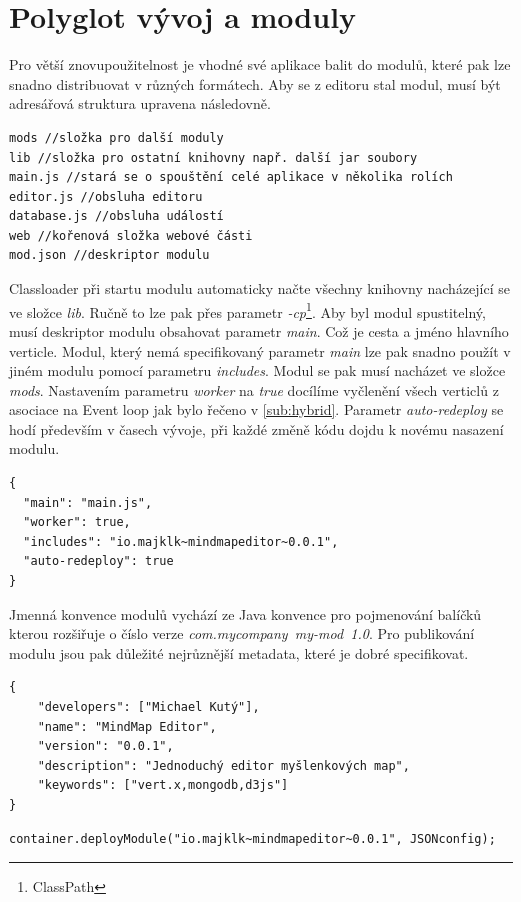 \section{Polyglot vývoj a moduly}\label{sec:praktickyModuly}

Pro větší znovupoužitelnost je vhodné své aplikace balit do modulů, které pak lze snadno distribuovat v různých formátech. Aby se z editoru stal modul, musí být adresářová struktura upravena následovně.

\begin{lstlisting}
mods //složka pro další moduly
lib //složka pro ostatní knihovny např. další jar soubory
main.js //stará se o spouštění celé aplikace v několika rolích
editor.js //obsluha editoru
database.js //obsluha událostí 
web //kořenová složka webové části
mod.json //deskriptor modulu
\end{lstlisting}

Classloader při startu modulu automaticky načte všechny knihovny nacházející se ve složce \emph{lib}. Ručně to lze pak přes parametr \emph{-cp}\footnote{ClassPath}. Aby byl modul spustitelný, musí deskriptor modulu obsahovat parametr \emph{main}. Což je cesta a jméno hlavního verticle. Modul, který nemá specifikovaný parametr \emph{main} lze pak snadno použít v jiném modulu pomocí parametru \emph{includes}. Modul se pak musí nacházet ve složce \emph{mods}. Nastavením parametru \emph{worker} na \emph{true} docílíme vyčlenění všech verticlů z asociace na Event loop jak bylo řečeno v \ref{sub:hybrid}. Parametr \emph{auto-redeploy} se hodí především v časech vývoje, při každé změně kódu dojdu k novému nasazení modulu. 
\begin{lstlisting}
{
  "main": "main.js",
  "worker": true,
  "includes": "io.majklk~mindmapeditor~0.0.1",
  "auto-redeploy": true
}
\end{lstlisting}

Jmenná konvence modulů vychází ze Java konvence\cite{javaPKG} pro pojmenování balíčků kterou rozšiřuje o číslo verze \emph{com.mycompany~my-mod~1.0}.
Pro publikování modulu jsou pak důležité nejrůznější metadata, které je dobré specifikovat.
\begin{lstlisting}
{
	"developers": ["Michael Kutý"],
	"name": "MindMap Editor",
	"version": "0.0.1",
	"description": "Jednoduchý editor myšlenkových map",
	"keywords": ["vert.x,mongodb,d3js"]
}  
\end{lstlisting}

\begin{lstlisting}[caption=Spuštění modulu v jazyce Java]
container.deployModule("io.majklk~mindmapeditor~0.0.1", JSONconfig);
\end{lstlisting}

